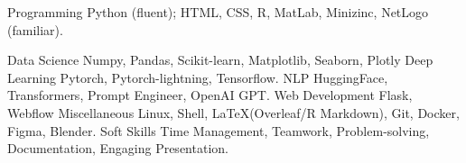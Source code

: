 

\begin{cvskills}

  \cvskill
    {Programming} %
    {Python (fluent); HTML, CSS, R, MatLab, Minizinc, NetLogo (familiar).} %

  \cvskill
    {Data Science} %
    {Numpy, Pandas, Scikit-learn, Matplotlib, Seaborn, Plotly} %
  \cvskill
    {Deep Learning} %
    {Pytorch, Pytorch-lightning, Tensorflow.} %
  \cvskill
    {NLP} %
    {HuggingFace, Transformers, Prompt Engineer, OpenAI GPT.} %
  \cvskill
    {Web Development} %
    {Flask, Webflow} %
  \cvskill
    {Miscellaneous} %
    {Linux, Shell, \LaTeX (Overleaf/R Markdown), Git, Docker, Figma, Blender.} %
  \cvskill
    {Soft Skills} %
    {Time Management, Teamwork, Problem-solving, Documentation, Engaging Presentation.} %

\end{cvskills}
